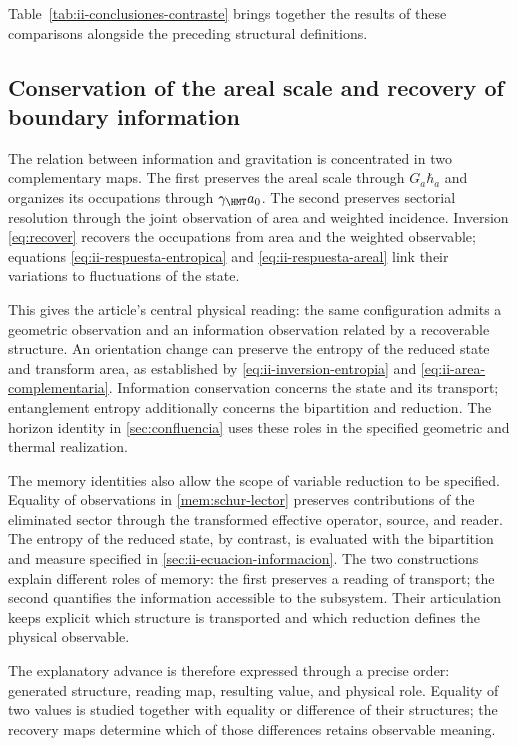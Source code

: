 Table~\ref{tab:ii-conclusiones-contraste} brings together the results of
these comparisons alongside the preceding structural definitions.


\subsection{Conservation of the areal scale and recovery of boundary information}

The relation between information and gravitation is concentrated in two
complementary maps. The first preserves the areal scale through
$G_a\hbar_a$ and organizes its occupations through
$\gamma_{\HMT}a_0$. The second preserves sectorial resolution through
the joint observation of area and weighted incidence. Inversion
\eqref{eq:recover} recovers the occupations from area and the
weighted observable; equations
\eqref{eq:ii-respuesta-entropica} and \eqref{eq:ii-respuesta-areal}
link their variations to fluctuations of the state.

This gives the article's central physical reading: the same
configuration admits a geometric observation and an information
observation related by a recoverable structure. An orientation
change can preserve the entropy of the reduced state and
transform area, as established by
\eqref{eq:ii-inversion-entropia} and \eqref{eq:ii-area-complementaria}.
Information conservation concerns the state and its transport;
entanglement entropy additionally concerns the bipartition and
reduction. The horizon identity in
\ref{sec:confluencia} uses these roles in the specified
geometric and thermal realization.

The memory identities also allow the scope of variable
reduction to be specified. Equality of observations in
\eqref{mem:schur-lector} preserves contributions of the eliminated sector
through the transformed effective operator, source, and reader.
The entropy of the reduced state, by contrast, is evaluated with the bipartition
and measure specified in \ref{sec:ii-ecuacion-informacion}.
The two constructions explain different roles of memory:
the first preserves a reading of transport; the second quantifies
the information accessible to the subsystem. Their articulation keeps
explicit which structure is transported and which reduction defines the
physical observable.

The explanatory advance is therefore expressed through a precise order:
generated structure, reading map, resulting value, and physical
role. Equality of two values is studied together with equality
or difference of their structures; the recovery maps determine
which of those differences retains observable meaning.
